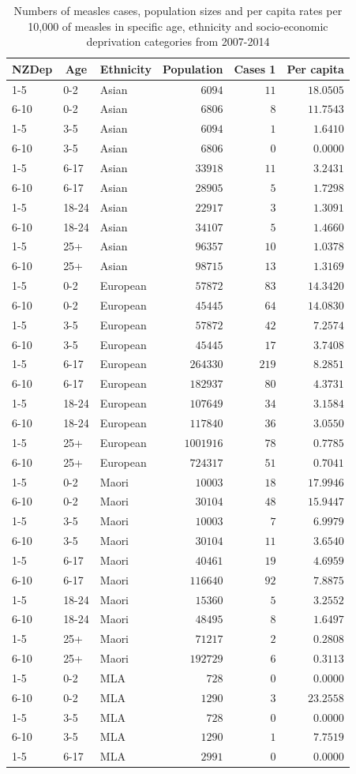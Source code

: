 \documentclass{article}
\begin{document}
\begin{itemize}
\begin{table}[hbtp]
\footnotesize
\caption{Numbers of measles cases, population sizes and per capita rates per 10,000 of measles in specific age, ethnicity and socio-economic deprivation categories from 2007-2014}
\begin{center}
\begin{tabular}{lllrrr}
\hline\hline
\multicolumn{1}{c}{NZDep}&\multicolumn{1}{c}{Age}&\multicolumn{1}{c}{Ethnicity}&\multicolumn{1}{c}{Population}&\multicolumn{1}{c}{Cases 1}&\multicolumn{1}{c}{Per capita}\tabularnewline
\hline
1-5&0-2&Asian&$   6094$&$ 11$&$18.0505$\tabularnewline
6-10&0-2&Asian&$   6806$&$  8$&$11.7543$\tabularnewline
1-5&3-5&Asian&$   6094$&$  1$&$ 1.6410$\tabularnewline
6-10&3-5&Asian&$   6806$&$  0$&$ 0.0000$\tabularnewline
1-5&6-17&Asian&$  33918$&$ 11$&$ 3.2431$\tabularnewline
6-10&6-17&Asian&$  28905$&$  5$&$ 1.7298$\tabularnewline
1-5&18-24&Asian&$  22917$&$  3$&$ 1.3091$\tabularnewline
6-10&18-24&Asian&$  34107$&$  5$&$ 1.4660$\tabularnewline
1-5&25+&Asian&$  96357$&$ 10$&$ 1.0378$\tabularnewline
6-10&25+&Asian&$  98715$&$ 13$&$ 1.3169$\tabularnewline
1-5&0-2&European&$  57872$&$ 83$&$14.3420$\tabularnewline
6-10&0-2&European&$  45445$&$ 64$&$14.0830$\tabularnewline
1-5&3-5&European&$  57872$&$ 42$&$ 7.2574$\tabularnewline
6-10&3-5&European&$  45445$&$ 17$&$ 3.7408$\tabularnewline
1-5&6-17&European&$ 264330$&$219$&$ 8.2851$\tabularnewline
6-10&6-17&European&$ 182937$&$ 80$&$ 4.3731$\tabularnewline
1-5&18-24&European&$ 107649$&$ 34$&$ 3.1584$\tabularnewline
6-10&18-24&European&$ 117840$&$ 36$&$ 3.0550$\tabularnewline
1-5&25+&European&$1001916$&$ 78$&$ 0.7785$\tabularnewline
6-10&25+&European&$ 724317$&$ 51$&$ 0.7041$\tabularnewline
1-5&0-2&Maori&$  10003$&$ 18$&$17.9946$\tabularnewline
6-10&0-2&Maori&$  30104$&$ 48$&$15.9447$\tabularnewline
1-5&3-5&Maori&$  10003$&$  7$&$ 6.9979$\tabularnewline
6-10&3-5&Maori&$  30104$&$ 11$&$ 3.6540$\tabularnewline
1-5&6-17&Maori&$  40461$&$ 19$&$ 4.6959$\tabularnewline
6-10&6-17&Maori&$ 116640$&$ 92$&$ 7.8875$\tabularnewline
1-5&18-24&Maori&$  15360$&$  5$&$ 3.2552$\tabularnewline
6-10&18-24&Maori&$  48495$&$  8$&$ 1.6497$\tabularnewline
1-5&25+&Maori&$  71217$&$  2$&$ 0.2808$\tabularnewline
6-10&25+&Maori&$ 192729$&$  6$&$ 0.3113$\tabularnewline
1-5&0-2&MLA&$    728$&$  0$&$ 0.0000$\tabularnewline
6-10&0-2&MLA&$   1290$&$  3$&$23.2558$\tabularnewline
1-5&3-5&MLA&$    728$&$  0$&$ 0.0000$\tabularnewline
6-10&3-5&MLA&$   1290$&$  1$&$ 7.7519$\tabularnewline
1-5&6-17&MLA&$   2991$&$  0$&$ 0.0000$\tabularnewline

\end{tabular}
\end{center}
\end{table}
\end{itemize}
\end{document}
